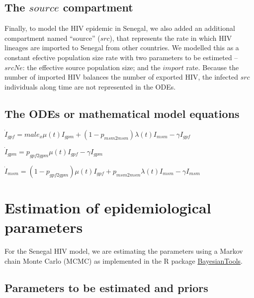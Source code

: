 \documentclass[12pt,]{article}
\begin{document}
\hypertarget{the-source-compartment}{%
\subsection{\texorpdfstring{The \(source\)
compartment}{The source compartment}}\label{the-source-compartment}}

Finally, to model the HIV epidemic in Senegal, we also added an
additional compartment named ``source'' (\(src\)), that represents the
rate in which HIV lineages are imported to Senegal from other countries.
We modelled this as a constant efective population size rate with two
parameters to be estimeted -- \(srcNe\): the effective source population
size; and the \(import\) rate. Because the number of imported HIV
balances the number of exported HIV, the infected \(src\) individuals
along time are not represented in the ODEs.

\hypertarget{the-odes-or-mathematical-model-equations}{%
\subsection{The ODEs or mathematical model
equations}\label{the-odes-or-mathematical-model-equations}}

\(\dot{I}_{gpf} = male_x \mu(t) I_{gpm} + (1 - p_{msm2msm}) \lambda(t) I_{msm} - \gamma I_{gpf}\)

\(\dot{I}_{gpm} = p_{gpf2gpm} \mu(t) I_{gpf} - \gamma I_{gpm}\)

\(\dot{I}_{msm} = (1 - p_{gpf2gpm}) \mu(t) I_{gpf} + p_{msm2msm} \lambda(t) I_{msm} - \gamma I_{msm}\)

\hypertarget{estimation-of-epidemiological-parameters}{%
\section{Estimation of epidemiological
parameters}\label{estimation-of-epidemiological-parameters}}

For the Senegal HIV model, we are estimating the parameters using a
Markov chain Monte Carlo (MCMC) as implemented in the R package
\href{\%22https://github.com/florianhartig/BayesianTools\%22}{BayesianTools}.

\hypertarget{parameters-to-be-estimated-and-priors}{%
\subsection{Parameters to be estimated and
priors}\label{parameters-to-be-estimated-and-priors}}
\end{document}
